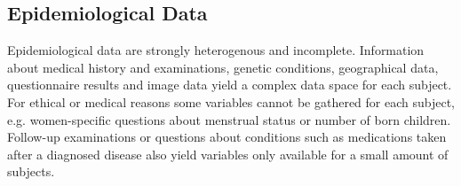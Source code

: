 \documentclass[journal]{style/vgtc} 			          %
\newcommand{\rem}[1]{\textcolor{red}{\sout{#1}}}
\newcommand{\com}[1]{\textcolor{orange}{\uline{#1}}}
\begin{document}
\subsection{Epidemiological Data} \label{EpidemiologicalData}
%

Epidemiological data are strongly heterogenous and incomplete.
%
Information about medical history and examinations, genetic conditions, geographical data, questionnaire results and image data yield a complex data space for each subject.
%
For ethical or medical reasons some variables cannot be gathered for each subject, e.g. women-specific questions about menstrual status or number of born children.
%
Follow-up examinations or questions about conditions such as medications taken after a diagnosed disease also yield variables only available for a small amount of subjects.
%
\end{document}
